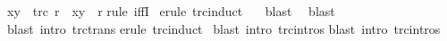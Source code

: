 \begin{isabellebody}
\isanewline
\isanewline
{}\ {\isachardoublequote}{\isacharparenleft}{\isacharparenleft}x{\isacharcomma}y{\isacharparenright}\ {\isasymin}\ trc{}\ r{\isacharparenright}\ {\isacharequal}\ {\isacharparenleft}{\isacharparenleft}x{\isacharcomma}y{\isacharparenright}\ {\isasymin}\ r{\isacharasterisk}{\isacharparenright}{\isachardoublequote}\isanewline
{}rule\ iffI{\isacharparenright}\isanewline
\ erule\ trc{}{\isachardot}induct{\isacharparenright}\isanewline
\ \ \ blast{\isacharparenright}\isanewline
\ \ blast{\isacharparenright}\isanewline
\ blast\ intro{\isacharcolon}\ trc{\isacharunderscore}trans{\isacharparenright}\isanewline
{}erule\ trc{\isachardot}induct{\isacharparenright}\isanewline
\ blast\ intro{\isacharcolon}\ trc{}{\isachardot}intros{\isacharparenright}\isanewline
{}blast\ intro{\isacharcolon}\ trc{}{\isachardot}intros{\isacharparenright}\isanewline
{}\isanewline
\end{isabellebody}%
